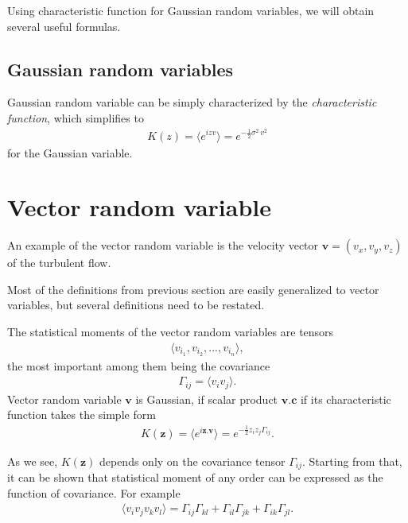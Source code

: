 \bigskip

Using characteristic function for Gaussian random variables, we will obtain several useful formulas.

\subsection{Gaussian random variables}
Gaussian random variable can be simply characterized by the \textit{characteristic function}, which simplifies to
\begin{align*}
K(z) = \langle e^{izv} \rangle = e^{-\frac{1}{2} \sigma^2 \, v^2}
\end{align*}
for the Gaussian variable.

\section{Vector random variable}
An example of the vector random variable is the velocity vector $\bm{v} = (v_x,v_y,v_z)$ of the turbulent flow.

Most of the definitions from previous section are easily generalized to vector variables, but several definitions need to be restated.

The statistical moments of the vector random variables are tensors
\begin{align}
\langle v_{i_1}, v_{i_2}, ..., v_{i_n} \rangle,
\end{align}
the most important among them being the covariance
\begin{align}
\Gamma_{ij} = \langle v_i v_j \rangle.
\end{align}
\bigskip
Vector random variable $\bm{v}$ is Gaussian, if scalar product $\bm{v}.\bm{c}$ if its characteristic function takes the simple form
\begin{align}
K(\bm{z}) = \langle e^{i\bm{z}.\bm{v}} \rangle = e^{-\frac{1}{2} z_i z_j \Gamma_{ij}}.
\end{align}

As we see, $K(\bm{z})$ depends only on the covariance tensor $\Gamma_{ij}$.
Starting from that, it can be shown that statistical moment of any order can be expressed as the function of covariance. For example
\begin{align}
\langle v_i v_j v_k v_l \rangle = \Gamma_{ij}\Gamma_{kl} + \Gamma_{il}\Gamma_{jk} + \Gamma_{ik}\Gamma_{jl}.
\end{align}

